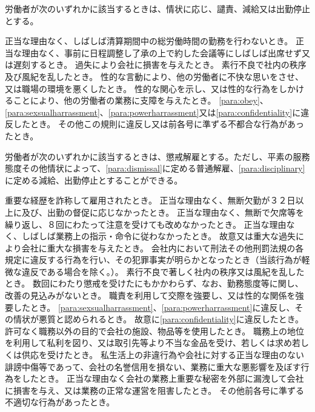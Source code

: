 \documentclass[10pt,a4paper]{jsarticle}
\begin{document}
労働者が次のいずれかに該当するときは、情状に応じ、譴責、減給又は出勤停止とする。
\label{para:disciplinary}
\begin{enumerate}
    \itm 正当な理由なく、しばしば清算期間中の総労働時間の勤務を行わないとき。
    \itm 正当な理由なく、事前に日程調整し了承の上で約した会議等にしばしば出席せず又は遅刻するとき。
    \itm 過失により会社に損害を与えたとき。
    \itm 素行不良で社内の秩序及び風紀を乱したとき。
    \itm 性的な言動により、他の労働者に不快な思いをさせ、又は職場の環境を悪くしたとき。
    \itm 性的な関心を示し、又は性的な行為をしかけることにより、他の労働者の業務に支障を与えたとき。
    \itm \ref{para:obey}、\ref{para:sexsualharrassment}、\ref{para:powerharrassment}又は\ref{para:confidentiality}に違反したとき。
    \itm その他この規則に違反し又は前各号に準ずる不都合な行為があったとき。
\end{enumerate}
\term
労働者が次のいずれかに該当するときは、懲戒解雇とする。ただし、平素の服務態度その他情状によって、\ref{para:dismissal}に定める普通解雇、\ref{para:disciplinary}に定める減給、出勤停止とすることができる。
\begin{enumerate}
    \itm 重要な経歴を詐称して雇用されたとき。
    \itm 正当な理由なく、無断欠勤が３２日以上に及び、出勤の督促に応じなかったとき。
    \itm 正当な理由なく、無断で欠席等を繰り返し、８回にわたって注意を受けても改めなかったとき。
    \itm 正当な理由なく、しばしば業務上の指示・命令に従わなかったとき。
    \itm 故意又は重大な過失により会社に重大な損害を与えたとき。
    \itm 会社内において刑法その他刑罰法規の各規定に違反する行為を行い、その犯罪事実が明らかとなったとき（当該行為が軽微な違反である場合を除く。）。
    \itm 素行不良で著しく社内の秩序又は風紀を乱したとき。
    \itm 数回にわたり懲戒を受けたにもかかわらず、なお、勤務態度等に関し、改善の見込みがないとき。
    \itm 職責を利用して交際を強要し、又は性的な関係を強要したとき。
    \itm \ref{para:sexsualharrassment}、\ref{para:powerharrassment}に違反し、その情状が悪質と認められるとき。
    \itm 故意に\ref{para:confidentiality}に違反したとき。
    \itm 許可なく職務以外の目的で会社の施設、物品等を使用したとき。
    \itm 職務上の地位を利用して私利を図り、又は取引先等より不当な金品を受け、若しくは求め若しくは供応を受けたとき。
    \itm 私生活上の非違行為や会社に対する正当な理由のない誹謗中傷等であって、会社の名誉信用を損ない、業務に重大な悪影響を及ぼす行為をしたとき。
    \itm 正当な理由なく会社の業務上重要な秘密を外部に漏洩して会社に損害を与え、又は業務の正常な運営を阻害したとき。
    \itm その他前各号に準ずる不適切な行為があったとき。
\end{enumerate}
\end{document}
